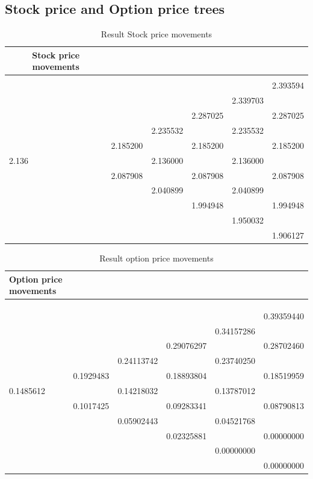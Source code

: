 \documentclass[11pt, titlepage]{article}
\begin{document}
{\subsection{Stock price and Option price trees}
{
\begin{table}[!h]
\centering
\caption{Result Stock price movements}
\label{S0 movement}
\begin{tabular}{@{}llllll@{}}
\toprule
\multicolumn{1}{c}{\textbf{Stock price movements}} &  &  &  &  &  \\ \midrule
 &  &  &  &  &  \\
 &  &  &  &  & 2.393594 \\
 &  &  &  & 2.339703 &  \\
 &  &  & 2.287025 &  & 2.287025 \\
 &  & 2.235532 &  & 2.235532 &  \\
 & 2.185200 &  & 2.185200 &  & 2.185200 \\
2.136 &  & 2.136000 &  & 2.136000 &  \\
 & 2.087908 &  & 2.087908 &  & 2.087908 \\
 &  & 2.040899 &  & 2.040899 &  \\
 &  &  & 1.994948 &  & 1.994948 \\
 &  &  &  & 1.950032 &  \\
 &  &  &  &  & 1.906127 \\ \bottomrule
\end{tabular}
\end{table}

\newpage

\begin{table}[t]
\centering
\caption{Result option price movements}
\label{Option movement}
\begin{tabular}{@{}llllll@{}}
\toprule
\textbf{Option price movements} &  &  &  &  &  \\ \midrule
 &  &  &  &  &  \\
 &  &  &  &  &  \\
 &  &  &  &  &  \\
 &  &  &  &  & 0.39359440 \\
 &  &  &  & 0.34157286 &  \\
 &  &  & 0.29076297 &  & 0.28702460 \\
 &  & 0.24113742 &  & 0.23740250 &  \\
 & 0.1929483 &  & 0.18893804 &  & 0.18519959 \\
0.1485612 &  & 0.14218032 &  & 0.13787012 &  \\
 & 0.1017425 &  & 0.09283341 &  & 0.08790813 \\
 &  & 0.05902443 &  & 0.04521768 &  \\
 &  &  & 0.02325881 &  & 0.00000000 \\
 &  &  &  & 0.00000000 &  \\
 &  &  &  &  & 0.00000000 \\ \bottomrule
\end{tabular}
\end{table}
}

}
\end{document}

